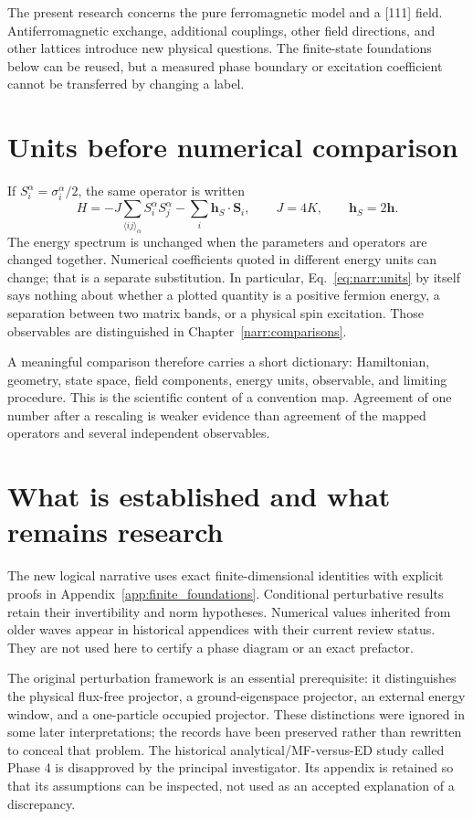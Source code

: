 The present research concerns the pure ferromagnetic model and a [111] field.
Antiferromagnetic exchange, additional couplings, other field directions, and
other lattices introduce new physical questions. The finite-state foundations
below can be reused, but a measured phase boundary or excitation coefficient
cannot be transferred by changing a label.

\section{Units before numerical comparison}
If $S_i^\alpha=\sigma_i^\alpha/2$, the same operator is written
\begin{equation}
 H=-J\sum_{\langle ij\rangle_\alpha} S_i^\alpha S_j^\alpha
       -\sum_i\bm h_S\cdot\bm S_i,
 \qquad J=4K,\qquad \bm h_S=2\bm h.
 \label{eq:narr:units}
\end{equation}
The energy spectrum is unchanged when the parameters and operators are changed
together. Numerical coefficients quoted in different energy units can change;
that is a separate substitution. In particular, Eq.~\eqref{eq:narr:units} by
itself says nothing about whether a plotted quantity is a positive fermion
energy, a separation between two matrix bands, or a physical spin excitation.
Those observables are distinguished in Chapter~\ref{narr:comparisons}.

A meaningful comparison therefore carries a short dictionary: Hamiltonian,
geometry, state space, field components, energy units, observable, and limiting
procedure. This is the scientific content of a convention map. Agreement of one
number after a rescaling is weaker evidence than agreement of the mapped
operators and several independent observables.

\section{What is established and what remains research}
The new logical narrative uses exact finite-dimensional identities with explicit
proofs in Appendix~\ref{app:finite_foundations}. Conditional perturbative results
retain their invertibility and norm hypotheses. Numerical values inherited from
older waves appear in historical appendices with their current review status.
They are not used here to certify a phase diagram or an exact prefactor.

The original perturbation framework is an essential prerequisite: it distinguishes
the physical flux-free projector, a ground-eigenspace projector, an external
energy window, and a one-particle occupied projector. These distinctions were
ignored in some later interpretations; the records have been preserved rather
than rewritten to conceal that problem. The historical analytical/MF-versus-ED
study called Phase 4 is disapproved by the principal investigator. Its appendix
is retained so that its assumptions can be inspected, not used as an accepted
explanation of a discrepancy.
